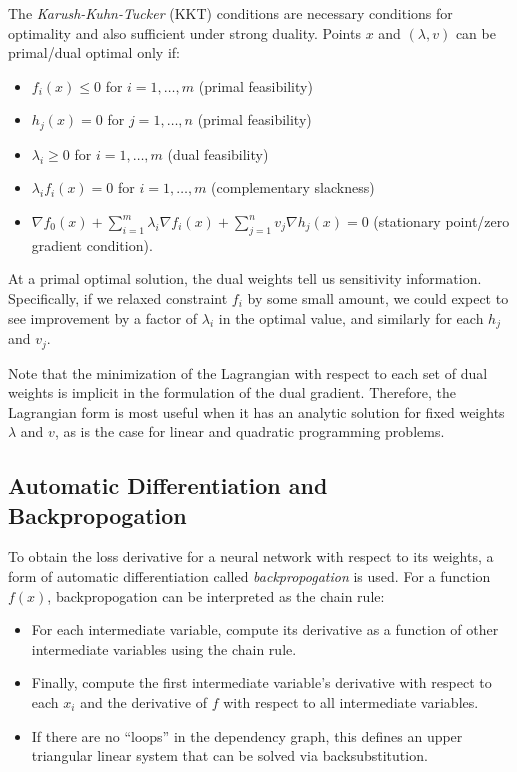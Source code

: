 \documentclass[12pt]{article}
\begin{document}
The {\it Karush-Kuhn-Tucker} (KKT) conditions are necessary
conditions for optimality and also sufficient under strong
duality.
Points $x$ and $(\lambda,v)$ can be primal/dual optimal only if:
\begin{itemize}
\item $f_i(x) \leq 0$ for $i=1,\ldots,m$ (primal feasibility)
\item $h_j(x) = 0$ for $j=1,\ldots,n$ (primal feasibility)
\item $\lambda_i \geq 0$ for $i=1,\ldots,m$ (dual feasibility)
\item $\lambda_if_i(x) = 0$ for $i=1,\ldots,m$ (complementary slackness)
\item $\nabla f_0(x) + \sum_{i=1}^m\lambda_i\nabla f_i(x) + \sum_{j=1}^n v_j\nabla h_j(x) = 0$ (stationary point/zero gradient condition).
\end{itemize}

At a primal optimal solution, the dual weights tell us sensitivity information.
Specifically, if we relaxed constraint $f_i$ by some small amount, we could
expect to see improvement by a factor of $\lambda_i$ in the optimal value,
and similarly for each $h_j$ and $v_j$.

Note that the minimization of the Lagrangian with respect to each set of dual
weights is implicit in the formulation of the dual gradient.
Therefore, the Lagrangian form is most useful when it has an 
analytic solution for fixed weights $\lambda$ and $v$, as is the case for 
linear and quadratic programming problems.

\subsection*{Automatic Differentiation and Backpropogation}

To obtain the loss derivative for a neural network with respect to its weights,
a form of automatic differentiation called {\it backpropogation} is used.
For a function $f(x)$, backpropogation can be interpreted as the chain rule:
\begin{itemize}
\item For each intermediate variable, compute its derivative as a function
of other intermediate variables using the chain rule.
\item Finally, compute the first intermediate variable's derivative with
respect to each $x_i$ and the derivative of $f$ with respect to all 
intermediate variables.
\item If there are no ``loops'' in the dependency graph, this defines an upper
triangular linear system that can be solved via backsubstitution.
\end{itemize}
\end{document}
